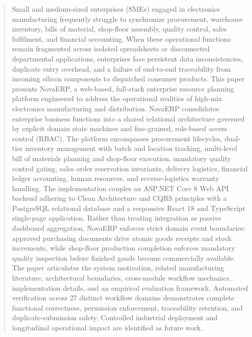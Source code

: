 \documentclass[conference]{IEEEtran}
\begin{document}
\begin{abstract}
Small and medium-sized enterprises (SMEs) engaged in electronics manufacturing frequently struggle to synchronize procurement, warehouse inventory, bills of material, shop-floor assembly, quality control, sales fulfilment, and financial accounting. When these operational functions remain fragmented across isolated spreadsheets or disconnected departmental applications, enterprises face persistent data inconsistencies, duplicate entry overhead, and a failure of end-to-end traceability from incoming silicon components to dispatched consumer products. This paper presents NovaERP, a web-based, full-stack enterprise resource planning platform engineered to address the operational realities of high-mix electronics manufacturing and distribution. NovaERP consolidates enterprise business functions into a shared relational architecture governed by explicit domain state machines and fine-grained, role-based access control (RBAC). The platform encompasses procurement lifecycles, dual-tier inventory management with batch and location tracking, multi-level bill of materials planning and shop-floor execution, mandatory quality control gating, sales order reservation invariants, delivery logistics, financial ledger accounting, human resources, and reverse-logistics warranty handling. The implementation couples an ASP.NET Core 8 Web API backend adhering to Clean Architecture and CQRS principles with a PostgreSQL relational database and a responsive React 18 and TypeScript single-page application. Rather than treating integration as passive dashboard aggregation, NovaERP enforces strict domain event boundaries: approved purchasing documents drive atomic goods receipts and stock increments, while shop-floor production completion enforces mandatory quality inspection before finished goods become commercially available. The paper articulates the system motivation, related manufacturing literature, architectural boundaries, cross-module workflow mechanics, implementation details, and an empirical evaluation framework. Automated verification across 27 distinct workflow domains demonstrates complete functional correctness, permission enforcement, traceability retention, and duplicate-submission safety. Controlled industrial deployment and longitudinal operational impact are identified as future work.
\end{abstract}
\end{document}

